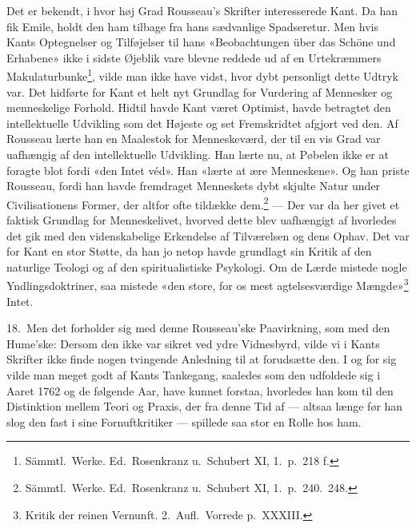 \documentclass[12pt,a4paper]{article}
\newcommand{\apage}[1]{\marginnote{\footnotesize\textit{[#1]}}}
\begin{document}
Det er bekendt, i hvor høj Grad Rousseau's Skrifter interesserede Kant.
Da han fik Emile, holdt den ham tilbage fra hans sædvanlige Spadseretur.
Men hvis Kants Optegnelser og Tilføjelser til hans «Beobachtungen über
das Schöne und Erhabene» ikke i sidste Øjeblik vare blevne reddede ud af
en Urtekræmmers Makulaturbunke\footnote{Sämmtl.\ Werke. Ed.\
Rosenkranz u.\ Schubert XI, 1.\ p.\ 218 f.}, vilde man ikke have vidst,
hvor dybt personligt dette Udtryk var. Det hidførte for Kant et helt nyt
Grundlag for Vurdering af Mennesker og menneskelige Forhold. Hidtil havde
Kant været Optimist, havde betragtet den intellektuelle Udvikling som det
Højeste og set Fremskridtet afgjort ved den. Af Rousseau lærte han en
Maalestok for Menneskeværd, der til en vis Grad var uafhængig af den
intellektuelle Udvikling. Han lærte nu, at Pøbelen ikke er at foragte
blot fordi «den Intet véd». Han «lærte at ære Menneskene». Og han priste
\apage{37} Rousseau, fordi han havde fremdraget Menneskets dybt skjulte Natur under
Civilisationens Former, der altfor ofte tildække
dem.\footnote{Sämmtl.\ Werke. Ed.\ Rosenkranz u.\ Schubert XI,
1.\ p.\ 240.\ 248.} --- Der var da her givet et faktisk Grundlag for
Menneskelivet, hvorved dette blev uafhængigt af hvorledes det gik med den
videnskabelige Erkendelse af Tilværelsen og dens Ophav. Det var for Kant
en stor Støtte, da han jo netop havde grundlagt sin Kritik af den
naturlige Teologi og af den spiritualistiske Psykologi. Om de Lærde
mistede nogle Yndlingsdoktriner, saa mistede «den store, for os mest
agtelsesværdige Mængde»\footnote{Kritik der reinen Vernunft. 2.\
Aufl.\ Vorrede p.\ XXXIII.} Intet.

18.\ Men det forholder sig med denne Rousseau'ske Paavirkning, som med
den Hume'ske: Dersom den ikke var sikret ved ydre Vidnesbyrd, vilde vi i
Kants Skrifter ikke finde nogen tvingende Anledning til at forudsætte
den. I og for sig vilde man meget godt af Kants Tankegang, saaledes som
den udfoldede sig i Aaret 1762 og de følgende Aar, have kunnet forstaa,
hvorledes han kom til den Distinktion mellem Teori og Praxis, der fra
denne Tid af --- altsaa længe før han slog den fast i sine Fornuftkritiker
--- spillede saa stor en Rolle hos ham.
\end{document}
